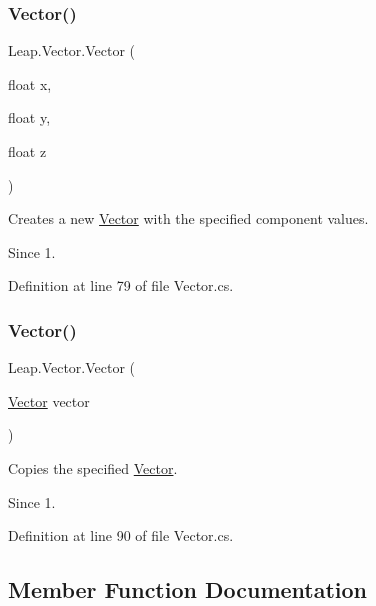 \subsubsection{\texorpdfstring{Vector()}{Vector()}\hspace{0.1cm}{\footnotesize\ttfamily [1/2]}}
{\footnotesize\ttfamily Leap.\+Vector.\+Vector (\begin{DoxyParamCaption}\item[{float}]{x,  }\item[{float}]{y,  }\item[{float}]{z }\end{DoxyParamCaption})}



Creates a new \mbox{\hyperlink{struct_leap_1_1_vector}{Vector}} with the specified component values. 

\begin{DoxySince}{Since}
1. 
\end{DoxySince}


Definition at line 79 of file Vector.\+cs.

\mbox{\label{struct_leap_1_1_vector_a1058e5cc80c4eb8f521f485269f7b614}} 
\subsubsection{\texorpdfstring{Vector()}{Vector()}\hspace{0.1cm}{\footnotesize\ttfamily [2/2]}}
{\footnotesize\ttfamily Leap.\+Vector.\+Vector (\begin{DoxyParamCaption}\item[{\mbox{\hyperlink{struct_leap_1_1_vector}{Vector}}}]{vector }\end{DoxyParamCaption})}



Copies the specified \mbox{\hyperlink{struct_leap_1_1_vector}{Vector}}. 

\begin{DoxySince}{Since}
1. 
\end{DoxySince}


Definition at line 90 of file Vector.\+cs.



\subsection{Member Function Documentation}
\mbox{\label{struct_leap_1_1_vector_a5833741990af0c182a41c75053d628b7}} 
